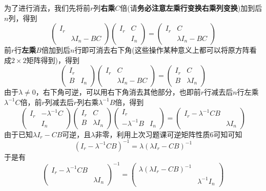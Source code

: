 \documentclass[a4paper,UTF8,fontset=windows]{ctexart}
\begin{document}
\begin{enumerate}
    为了进行消去，我们先将前$r$列\textbf{右乘}$C$倍(请\textbf{务必注意左乘行变换右乘列变换})加到后$n$列，得到
    $$\begin{pmatrix}I_r&\\ &\lambda I_n-BC\end{pmatrix}\begin{pmatrix}I_r&C\\ &I_n\end{pmatrix}=\begin{pmatrix}I_r&C\\ &\lambda I_n-BC\end{pmatrix}$$
    前$r$行\textbf{左乘}$B$倍加到后$n$行即可消去右下角(这些操作某种意义上都可以将原方阵看成$2\times2$矩阵得到)，得到
    $$\begin{pmatrix}I_r&\\B&I_n\end{pmatrix}\begin{pmatrix}I_r&C\\ &\lambda I_n-BC\end{pmatrix}=\begin{pmatrix}I_r&C\\B&\lambda I_n\end{pmatrix}$$
    由于$\lambda\ne0$，右下角可逆，可以用右下角消去其他部分，也即前$r$行减去后$n$行左乘$\lambda^{-1}C$倍，前$r$列减去后$r$列右乘$\lambda^{-1}B$倍，得到
    $$\begin{pmatrix}I_r&-\lambda^{-1}C\\ &I_n\end{pmatrix}\begin{pmatrix}I_r&C\\B&\lambda I_n\end{pmatrix}\begin{pmatrix}I_r&\\-\lambda^{-1}B&I_n\end{pmatrix}=\begin{pmatrix}I_r-\lambda^{-1}CB&\\ &\lambda I_n\end{pmatrix}$$
    由于已知$\lambda I_r-CB$可逆，且$\lambda$非零，利用上次习题课可逆矩阵性质6可知可知
    $$(I_r-\lambda^{-1}CB)^{-1}=\lambda(\lambda I_r-CB)^{-1}$$
    于是有
    $$\begin{pmatrix}I_r-\lambda^{-1}CB&\\ &\lambda I_n\end{pmatrix}^{-1}=\begin{pmatrix}\lambda(\lambda I_r-CB)^{-1}&\\ &\lambda^{-1}I_n\end{pmatrix}$$

\end{enumerate}
\end{document}
